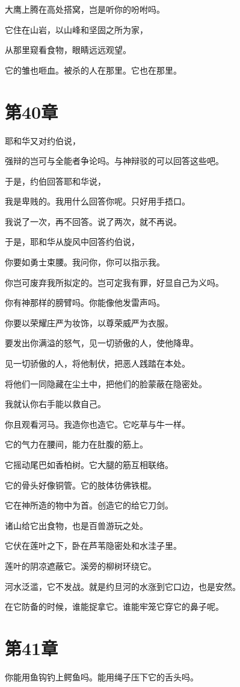 \documentclass[12pt,oneside]{book}
\begin{document}
大鹰上腾在高处搭窝，岂是听你的吩咐吗。

它住在山岩，以山峰和坚固之所为家，

从那里窥看食物，眼睛远远观望。

它的雏也咂血。被杀的人在那里。它也在那里。


\chapter{第40章}
耶和华又对约伯说，

强辩的岂可与全能者争论吗。与神辩驳的可以回答这些吧。

于是，约伯回答耶和华说，

我是卑贱的。我用什么回答你呢。只好用手捂口。

我说了一次，再不回答。说了两次，就不再说。

于是，耶和华从旋风中回答约伯说，

你要如勇士束腰。我问你，你可以指示我。

你岂可废弃我所拟定的。岂可定我有罪，好显自己为义吗。

你有神那样的膀臂吗。你能像他发雷声吗。

你要以荣耀庄严为妆饰，以尊荣威严为衣服。

要发出你满溢的怒气，见一切骄傲的人，使他降卑。

见一切骄傲的人，将他制伏，把恶人践踏在本处。

将他们一同隐藏在尘土中，把他们的脸蒙蔽在隐密处。

我就认你右手能以救自己。

你且观看河马。我造你也造它。它吃草与牛一样。

它的气力在腰间，能力在肚腹的筋上。

它摇动尾巴如香柏树。它大腿的筋互相联络。

它的骨头好像铜管。它的肢体彷佛铁棍。

它在神所造的物中为首。创造它的给它刀剑。

诸山给它出食物，也是百兽游玩之处。

它伏在莲叶之下，卧在芦苇隐密处和水洼子里。

莲叶的阴凉遮蔽它。溪旁的柳树环绕它。

河水泛滥，它不发战。就是约旦河的水涨到它口边，也是安然。

在它防备的时候，谁能捉拿它。谁能牢笼它穿它的鼻子呢。


\chapter{第41章}
你能用鱼钩钓上鳄鱼吗。能用绳子压下它的舌头吗。
\end{document}
